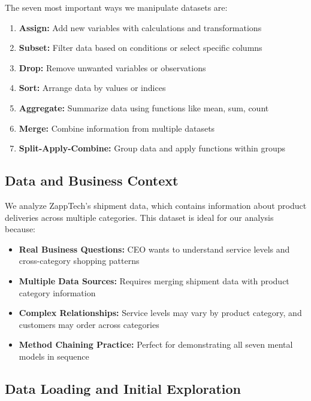 \documentclass[
]{article}
\providecommand{\tightlist}{%
  \setlength{\itemsep}{0pt}\setlength{\parskip}{0pt}}
\begin{document}
The seven most important ways we manipulate datasets are:

\begin{enumerate}
\def\labelenumi{\arabic{enumi}.}
\tightlist
\item
  \textbf{Assign:} Add new variables with calculations and
  transformations
\item
  \textbf{Subset:} Filter data based on conditions or select specific
  columns
\item
  \textbf{Drop:} Remove unwanted variables or observations
\item
  \textbf{Sort:} Arrange data by values or indices
\item
  \textbf{Aggregate:} Summarize data using functions like mean, sum,
  count
\item
  \textbf{Merge:} Combine information from multiple datasets
\item
  \textbf{Split-Apply-Combine:} Group data and apply functions within
  groups
\end{enumerate}

\subsection{Data and Business Context}\label{data-and-business-context}

We analyze ZappTech's shipment data, which contains information about
product deliveries across multiple categories. This dataset is ideal for
our analysis because:

\begin{itemize}
\tightlist
\item
  \textbf{Real Business Questions:} CEO wants to understand service
  levels and cross-category shopping patterns
\item
  \textbf{Multiple Data Sources:} Requires merging shipment data with
  product category information
\item
  \textbf{Complex Relationships:} Service levels may vary by product
  category, and customers may order across categories
\item
  \textbf{Method Chaining Practice:} Perfect for demonstrating all seven
  mental models in sequence
\end{itemize}

\subsection{Data Loading and Initial
Exploration}\label{data-loading-and-initial-exploration}
\end{document}
